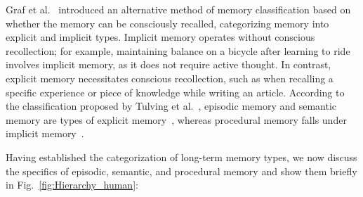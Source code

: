 \documentclass[journal,hideappendix]{vgtc}
\begin{document}
Graf et al.~\cite{graf1985implicit} introduced an alternative method of memory classification based on whether the memory can be consciously recalled, categorizing memory into explicit and implicit types. Implicit memory operates without conscious recollection; for example, maintaining balance on a bicycle after learning to ride involves implicit memory, as it does not require active thought. In contrast, explicit memory necessitates conscious recollection, such as when recalling a specific experience or piece of knowledge while writing an article. 
According to the classification proposed by Tulving et al.~\cite{tulving1985memory}, episodic memory and semantic memory are types of explicit memory~\cite{tulving1972episodic}, whereas procedural memory falls under implicit memory~\cite{schacter1987implicit}. 

Having established the categorization of long-term memory types, we now discuss the specifics of episodic, semantic, and procedural memory and show them briefly in Fig.~\ref{fig:Hierarchy_human}:
\end{document}
